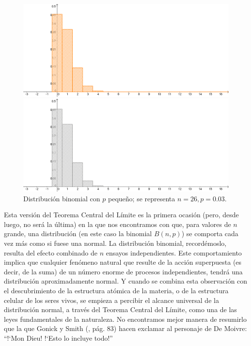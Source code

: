 \begin{figure}[htbp]
\begin{center}
\begin{enColor}
\includegraphics[width=13cm]{../fig/Cap05-BinomialVsNormal-TCL-2.png}
\end{enColor}
\begin{bn}
\includegraphics[width=13cm]{../fig/Cap05-BinomialVsNormal-TCL-2-bn.png}
\end{bn}
\caption{Distribución binomial con $p$ pequeño; se representa $n=26, p=0.03$. }
\label{cap05:fig:TCLcasonovalido}
\end{center}
\end{figure}

Esta versión del Teorema Central del Límite es la primera ocasión (pero, desde luego, no será la última) en la que nos encontramos con que, para valores de $n$ grande, una distribución (en este caso la binomial $B(n,p)$) se comporta cada vez más como si fuese una normal. La distribución binomial, recordémoslo, resulta del efecto combinado de $n$ ensayos independientes. Este comportamiento implica que cualquier fenómeno natural que resulte de la acción superpuesta (es decir, de la suma) de un número enorme de procesos independientes, tendrá una distribución aproximadamente normal. Y cuando se combina esta observación con el descubrimiento de la estructura atómica de la materia, o de la estructura celular de los seres vivos, se empieza a percibir el {\sf alcance universal de la distribución normal}, a través del Teorema Central del Límite, como una de las leyes fundamentales de la naturaleza. No encontramos mejor manera de resumirlo que la que Gonick y Smith (\cite{EstadisticaComic}, pág. 83) hacen exclamar al personaje de De Moivre: ``{!`}Mon Dieu! {!`}Esto lo incluye todo!''


